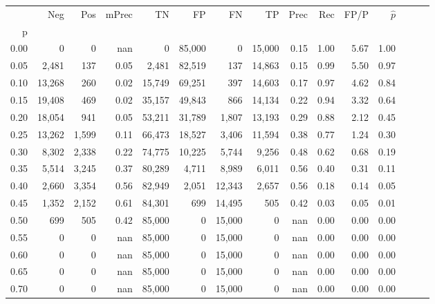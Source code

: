 \begin{tabular}{rrrrrrrrrrrrrrr}
\toprule
{} &     Neg &    Pos & mPrec &      TN &      FP &      FN &      TP &  Prec &   Rec &  FP/P & $\hat{p}$ \\
p    &         &        &       &         &         &         &         &       &       &       &           \\
\midrule
0.00 &       0 &      0 &   nan &       0 &  85,000 &       0 &  15,000 &  0.15 &  1.00 &  5.67 &      1.00 \\
0.05 &   2,481 &    137 &  0.05 &   2,481 &  82,519 &     137 &  14,863 &  0.15 &  0.99 &  5.50 &      0.97 \\
0.10 &  13,268 &    260 &  0.02 &  15,749 &  69,251 &     397 &  14,603 &  0.17 &  0.97 &  4.62 &      0.84 \\
0.15 &  19,408 &    469 &  0.02 &  35,157 &  49,843 &     866 &  14,134 &  0.22 &  0.94 &  3.32 &      0.64 \\
0.20 &  18,054 &    941 &  0.05 &  53,211 &  31,789 &   1,807 &  13,193 &  0.29 &  0.88 &  2.12 &      0.45 \\
0.25 &  13,262 &  1,599 &  0.11 &  66,473 &  18,527 &   3,406 &  11,594 &  0.38 &  0.77 &  1.24 &      0.30 \\
0.30 &   8,302 &  2,338 &  0.22 &  74,775 &  10,225 &   5,744 &   9,256 &  0.48 &  0.62 &  0.68 &      0.19 \\
0.35 &   5,514 &  3,245 &  0.37 &  80,289 &   4,711 &   8,989 &   6,011 &  0.56 &  0.40 &  0.31 &      0.11 \\
0.40 &   2,660 &  3,354 &  0.56 &  82,949 &   2,051 &  12,343 &   2,657 &  0.56 &  0.18 &  0.14 &      0.05 \\
0.45 &   1,352 &  2,152 &  0.61 &  84,301 &     699 &  14,495 &     505 &  0.42 &  0.03 &  0.05 &      0.01 \\
0.50 &     699 &    505 &  0.42 &  85,000 &       0 &  15,000 &       0 &   nan &  0.00 &  0.00 &      0.00 \\
0.55 &       0 &      0 &   nan &  85,000 &       0 &  15,000 &       0 &   nan &  0.00 &  0.00 &      0.00 \\
0.60 &       0 &      0 &   nan &  85,000 &       0 &  15,000 &       0 &   nan &  0.00 &  0.00 &      0.00 \\
0.65 &       0 &      0 &   nan &  85,000 &       0 &  15,000 &       0 &   nan &  0.00 &  0.00 &      0.00 \\
0.70 &       0 &      0 &   nan &  85,000 &       0 &  15,000 &       0 &   nan &  0.00 &  0.00 &      0.00 \\

\end{tabular}
